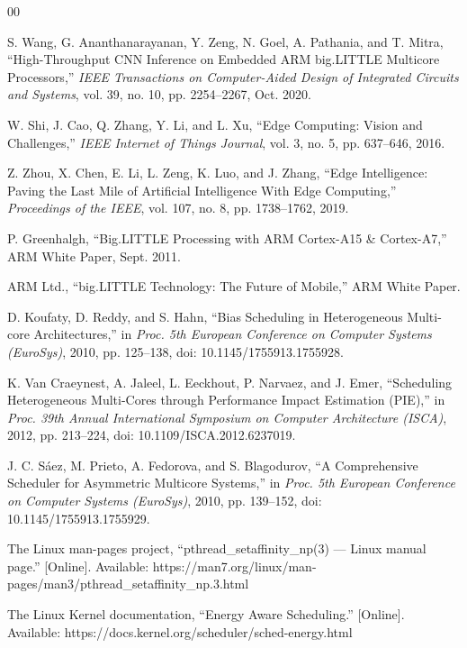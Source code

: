 \documentclass[conference]{IEEEtran}
\begin{document}
\begin{thebibliography}{00}

S. Wang, G. Ananthanarayanan, Y. Zeng, N. Goel, A. Pathania, and T. Mitra, ``High-Throughput CNN Inference on Embedded ARM big.LITTLE Multicore Processors,'' \textit{IEEE Transactions on Computer-Aided Design of Integrated Circuits and Systems}, vol. 39, no. 10, pp. 2254--2267, Oct. 2020.

W. Shi, J. Cao, Q. Zhang, Y. Li, and L. Xu, ``Edge Computing: Vision and Challenges,'' \textit{IEEE Internet of Things Journal}, vol. 3, no. 5, pp. 637--646, 2016.

Z. Zhou, X. Chen, E. Li, L. Zeng, K. Luo, and J. Zhang, ``Edge Intelligence: Paving the Last Mile of Artificial Intelligence With Edge Computing,'' \textit{Proceedings of the IEEE}, vol. 107, no. 8, pp. 1738--1762, 2019.

P. Greenhalgh, ``Big.LITTLE Processing with ARM Cortex\texttrademark-A15 \& Cortex-A7,'' ARM White Paper, Sept. 2011.

ARM Ltd., ``big.LITTLE Technology: The Future of Mobile,'' ARM White Paper.

D. Koufaty, D. Reddy, and S. Hahn, ``Bias Scheduling in Heterogeneous Multi-core Architectures,'' in \textit{Proc. 5th European Conference on Computer Systems (EuroSys)}, 2010, pp. 125--138, doi: 10.1145/1755913.1755928.

K. Van Craeynest, A. Jaleel, L. Eeckhout, P. Narvaez, and J. Emer, ``Scheduling Heterogeneous Multi-Cores through Performance Impact Estimation (PIE),'' in \textit{Proc. 39th Annual International Symposium on Computer Architecture (ISCA)}, 2012, pp. 213--224, doi: 10.1109/ISCA.2012.6237019.

J. C. S\'{a}ez, M. Prieto, A. Fedorova, and S. Blagodurov, ``A Comprehensive Scheduler for Asymmetric Multicore Systems,'' in \textit{Proc. 5th European Conference on Computer Systems (EuroSys)}, 2010, pp. 139--152, doi: 10.1145/1755913.1755929.

The Linux man-pages project, ``pthread\_setaffinity\_np(3) --- Linux manual page.'' [Online]. Available: https://man7.org/linux/man-pages/man3/pthread\_setaffinity\_np.3.html

The Linux Kernel documentation, ``Energy Aware Scheduling.'' [Online]. Available: https://docs.kernel.org/scheduler/sched-energy.html


\end{thebibliography}
\end{document}
